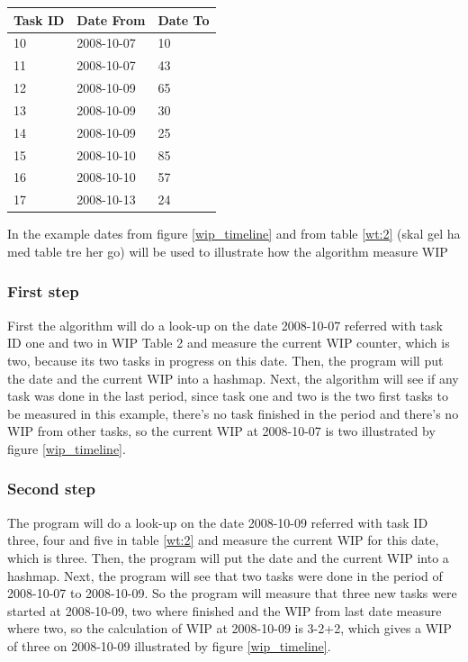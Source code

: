 \documentclass[UKenglish]{ifimaster}  %
\begin{document}
\begin{center}
    \begin{tabular}{| l | l | p{5cm} |}
    \hline
   Task ID &   Date From  & Date To\\ \hline
     10 & 2008-10-07 & 10\\ \hline
     11 & 2008-10-07 &  43\\ \hline
     12 & 2008-10-09 & 65   \\ \hline
     13 & 2008-10-09 & 30   \\ \hline
     14 & 2008-10-09 & 25   \\ \hline
     15 & 2008-10-10 & 85   \\ \hline
     16 & 2008-10-10 & 57   \\ \hline
     17 & 2008-10-13 & 24   \\ \hline
    \end{tabular}

\label{wt:3} %
\end{center}

In the example dates from figure \ref{wip_timeline} and from table \ref{wt:2} (skal gel ha med table tre her go) will be used to illustrate how the algorithm measure WIP

\subsubsection{First step}
\label{subsubsec:ft}
First the algorithm will do a look-up on the date 2008-10-07 referred with task ID one and two in WIP Table 2 and measure the current WIP counter, which is two, because its two tasks in progress on this date. Then, the program will put the date and the current WIP into a hashmap. 
Next, the algorithm will see if any task was done in the last period, since task one and two is the two first tasks to be measured in this example, there's no task finished in the period and there's no WIP from other tasks, so the current WIP at 2008-10-07 is two illustrated by figure \ref{wip_timeline}. 
\subsubsection{Second step}
The program will do a look-up on the date 2008-10-09 referred with task ID three, four and five in table \ref{wt:2}  and measure the current WIP for this date, which is three. Then, the program will put the date and the current WIP into a hashmap.
Next, the program will see that two tasks were done in the period of 2008-10-07 to 2008-10-09. So the program will measure that three new tasks were started at 2008-10-09, two where finished and the WIP from last date measure where two, so the calculation of WIP at 2008-10-09 is 3-2+2, which gives a WIP of three on 2008-10-09 illustrated by figure \ref{wip_timeline}. 
\end{document}
